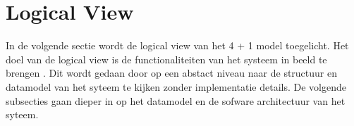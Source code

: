 \section{Logical View}
In de volgende sectie wordt de logical view van het 4 + 1 model toegelicht.
Het doel van de logical view is de functionaliteiten van het systeem in beeld te brengen \parencite{4+1ViewModelPaper}.
Dit wordt gedaan door op een abstact niveau naar de structuur en datamodel van het syteem te kijken zonder implementatie details.
De volgende subsecties gaan dieper in op het datamodel en de sofware architectuur van het syteem.


\newpage

